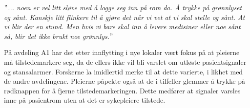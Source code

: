 \noindent
\textit{$"$... noen er vel litt sløve med å logge seg inn på rom da. Å trykke på grønnlyset og sånt. Kanskje litt flinkere til å gjøre det når vi vet at vi skal stelle og sånt. At vi blir der en stund. Men hvis vi bare skal inn å levere medisiner eller noe sånt så, blir det ikke brukt noe grønnlys.$"$}

\noindent
På avdeling A1 har det etter innflytting i nye lokaler vært fokus på at pleierne må tilstedemarkere seg, da de ellers ikke vil bli varslet om utløste pasientsignaler og stansalarmer. Forskerne la imidlertid merke til at dette varierte, i likhet med de andre avdelingene. Pleierne påpekte også at de i tilfeller glemmer å trykke på rødknappen for å fjerne tilstedemarkeringen. Dette medfører at signaler varsles inne på pasientrom uten at det er sykepleiere tilstede. 

